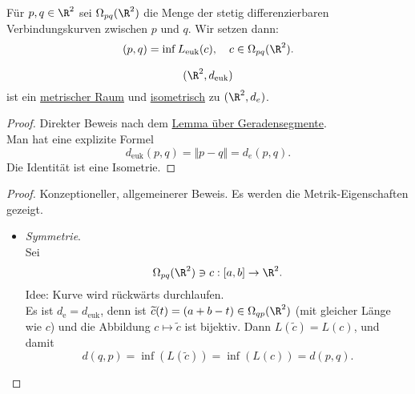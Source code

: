 \begin{definition}
  Für $ p,q \in \R^2 $ sei $ \Omega_{pq}(\R^2) $ die Menge der stetig differenzierbaren Verbindungskurven zwischen $ p $ und $ q $. Wir setzen dann:
  \begin{equation*}
    (p,q) = \inf L_\text{euk}(c), \quad c \in \Omega_{pq}(\R^2)\text{.}
  \end{equation*}
\end{definition}

\begin{theorem}
  \begin{equation*}
    (\R^2, d_\text{euk})
  \end{equation*}
  ist ein \hyperref[def:metrischerRaum]{metrischer Raum} und \hyperref[def:isometrie]{isometrisch} zu $ (\R^2, d_e) $.
  \begin{proof}
    Direkter Beweis nach dem \hyperref[lemma:geradenkurz]{Lemma über Geradensegmente}. \\
    Man hat eine explizite Formel
    \begin{equation*}
      d_{\text{euk}}(p,q) = \Vert p - q \Vert = d_e(p,q)\text{.}
    \end{equation*}
    Die Identität ist eine Isometrie.
  \end{proof}
  \begin{proof}
    Konzeptioneller, allgemeinerer Beweis. Es werden die Metrik-Eigenschaften gezeigt.

    \begin{itemize}
      \item \emph{Symmetrie}. \\
        Sei
        \begin{equation*}
          \Omega_{pq}(\R^2) \ni c: [a,b] \to \R^2\text{.}
       \end{equation*}
       Idee: Kurve wird rückwärts durchlaufen. \\
       Es ist $ d_\text{e} = d_\text{euk} $, denn ist $ \widetilde{c}(t) = (a+b-t) \in \Omega_{qp}(\R^2) $ (mit gleicher Länge wie $ c $) und die Abbildung $ c \mapsto \widetilde{c} $ ist bijektiv. Dann $ L(\widetilde{c}) = L(c) $, und damit
       \begin{equation*}
         d(q,p) = \inf(L(\widetilde{c})) = \inf(L(c)) = d(p,q)\text{.}
       \end{equation*}


\end{itemize}
\end{proof}
\end{theorem}
